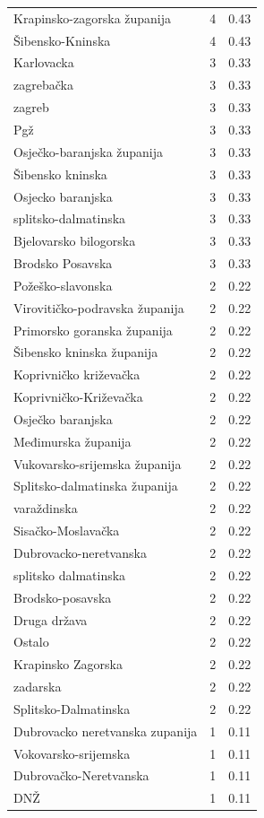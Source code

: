 \begin{tabular}{lrr}
Krapinsko-zagorska županija & 4 & 0.43 \\
Šibensko-Kninska & 4 & 0.43 \\
Karlovacka & 3 & 0.33 \\
zagrebačka & 3 & 0.33 \\
zagreb & 3 & 0.33 \\
Pgž & 3 & 0.33 \\
Osječko-baranjska županija & 3 & 0.33 \\
Šibensko kninska & 3 & 0.33 \\
Osjecko baranjska & 3 & 0.33 \\
splitsko-dalmatinska & 3 & 0.33 \\
Bjelovarsko bilogorska & 3 & 0.33 \\
Brodsko Posavska & 3 & 0.33 \\
Požeško-slavonska & 2 & 0.22 \\
Virovitičko-podravska županija & 2 & 0.22 \\
Primorsko goranska županija & 2 & 0.22 \\
Šibensko kninska županija & 2 & 0.22 \\
Koprivničko križevačka & 2 & 0.22 \\
Koprivničko-Križevačka & 2 & 0.22 \\
Osječko baranjska & 2 & 0.22 \\
Međimurska županija & 2 & 0.22 \\
Vukovarsko-srijemska županija & 2 & 0.22 \\
Splitsko-dalmatinska županija & 2 & 0.22 \\
varaždinska & 2 & 0.22 \\
Sisačko-Moslavačka & 2 & 0.22 \\
Dubrovacko-neretvanska & 2 & 0.22 \\
splitsko dalmatinska & 2 & 0.22 \\
Brodsko-posavska & 2 & 0.22 \\
Druga država & 2 & 0.22 \\
Ostalo & 2 & 0.22 \\
Krapinsko Zagorska & 2 & 0.22 \\
zadarska & 2 & 0.22 \\
Splitsko-Dalmatinska & 2 & 0.22 \\
Dubrovacko neretvanska zupanija & 1 & 0.11 \\
Vokovarsko-srijemska & 1 & 0.11 \\
Dubrovačko-Neretvanska & 1 & 0.11 \\
DNŽ & 1 & 0.11 \\

\end{tabular}
